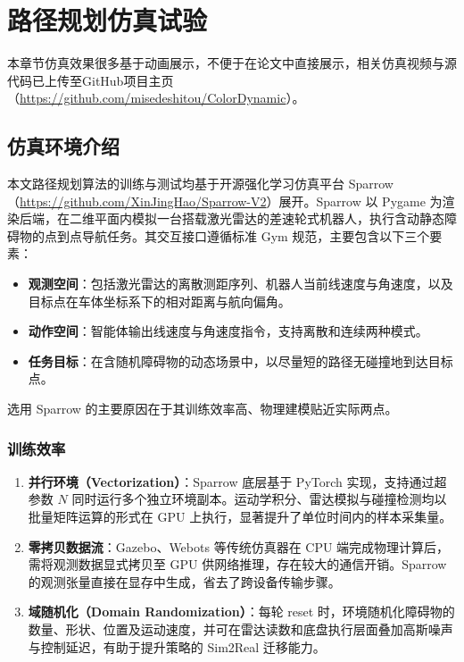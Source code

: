 \chapter{路径规划仿真试验}\label{chap:path_planning_simulation}
本章节仿真效果很多基于动画展示，不便于在论文中直接展示，相关仿真视频与源代码已上传至GitHub项目主页（\url{https://github.com/misedeshitou/ColorDynamic}）。

\section{仿真环境介绍}

本文路径规划算法的训练与测试均基于开源强化学习仿真平台 Sparrow（\url{https://github.com/XinJingHao/Sparrow-V2}）展开。Sparrow 以 Pygame 为渲染后端，在二维平面内模拟一台搭载激光雷达的差速轮式机器人，执行含动静态障碍物的点到点导航任务。其交互接口遵循标准 Gym 规范，主要包含以下三个要素：

\begin{itemize}
    \item \textbf{观测空间}：包括激光雷达的离散测距序列、机器人当前线速度与角速度，以及目标点在车体坐标系下的相对距离与航向偏角。
    \item \textbf{动作空间}：智能体输出线速度与角速度指令，支持离散和连续两种模式。
    \item \textbf{任务目标}：在含随机障碍物的动态场景中，以尽量短的路径无碰撞地到达目标点。
\end{itemize}

选用 Sparrow 的主要原因在于其训练效率高、物理建模贴近实际两点。

\subsection{训练效率}

\begin{enumerate}
    \item \textbf{并行环境（Vectorization）}：Sparrow 底层基于 PyTorch 实现，支持通过超参数 $N$ 同时运行多个独立环境副本。运动学积分、雷达模拟与碰撞检测均以批量矩阵运算的形式在 GPU 上执行，显著提升了单位时间内的样本采集量。
    \item \textbf{零拷贝数据流}：Gazebo、Webots 等传统仿真器在 CPU 端完成物理计算后，需将观测数据显式拷贝至 GPU 供网络推理，存在较大的通信开销。Sparrow 的观测张量直接在显存中生成，省去了跨设备传输步骤。
    \item \textbf{域随机化（Domain Randomization）}：每轮 reset 时，环境随机化障碍物的数量、形状、位置及运动速度，并可在雷达读数和底盘执行层面叠加高斯噪声与控制延迟，有助于提升策略的 Sim2Real 迁移能力。
\end{enumerate}

